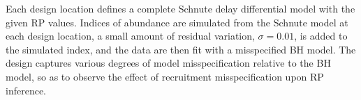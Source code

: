 %
Each design location defines a complete Schnute delay differential model with 
the given RP values. Indices of abundance are simulated from the Schnute model 
at each design location, a small amount of residual variation, $\sigma = 0.01$, 
is added to the simulated index, and the data are then fit with a misspecified 
BH model. The design captures various degrees of model misspecification 
relative to the BH model, so as to observe the effect of recruitment 
misspecification upon RP inference.




%

